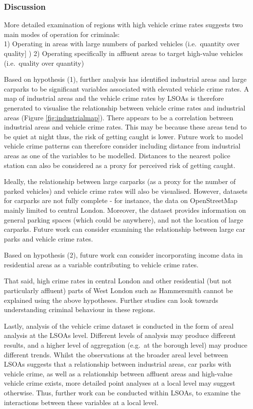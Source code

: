\documentclass[]{article}
\begin{document}
\subsubsection{Discussion}\label{discussion}

More detailed examination of regions with high vehicle crime rates
suggests two main modes of operation for criminals:\\
1) Operating in areas with large numbers of parked vehicles
(i.e.~quantity over quality{]} ) 2) Operating specifically in affluent
areas to target high-value vehicles (i.e.~quality over quantity)

Based on hypothesis (1), further analysis has identified industrial
areas and large carparks to be significant variables associated with
elevated vehicle crime rates. A map of industrial areas and the vehicle
crime rates by LSOAs is therefore generated to visualise the
relationship between vehicle crime rates and industrial areas (Figure
\ref{fig:industrialmap}). There appears to be a correlation between
industrial areas and vehicle crime rates. This may be because these
areas tend to be quiet at night thus, the risk of getting caught is
lower. Future work to model vehicle crime patterns can therefore
consider including distance from industrial areas as one of the
variables to be modelled. Distances to the nearest police station can
also be considered as a proxy for perceived risk of getting caught.

Ideally, the relationship between large carparks (as a proxy for the
number of parked vehicles) and vehicle crime rates will also be
visualised. However, datasets for carparks are not fully complete - for
instance, the data on OpenStreetMap mainly limited to central London.
Moreover, the dataset provides information on general parking spaces
(which could be anywhere), and not the location of large carparks.
Future work can consider examining the relationship between large car
parks and vehicle crime rates.

Based on hypothesis (2), future work can consider incorporating income
data in residential areas as a variable contributing to vehicle crime
rates.

That said, high crime rates in central London and other residential (but
not particularly affluent) parts of West London such as Hammersmith
cannot be explained using the above hypotheses. Further studies can look
towards understanding criminal behaviour in these regions.

Lastly, analysis of the vehicle crime dataset is conducted in the form
of areal analysis at the LSOAs level. Different levels of analysis may
produce different results, and a higher level of aggregation (e.g.~at
the borough level) may produce different trends. Whilst the observations
at the broader areal level between LSOAs suggests that a relationship
between industrial areas, car parks with vehicle crime, as well as a
relationship between affluent areas and high-value vehicle crime exists,
more detailed point analyses at a local level may suggest otherwise.
Thus, further work can be conducted within LSOAs, to examine the
interactions between these variables at a local level.
\end{document}
